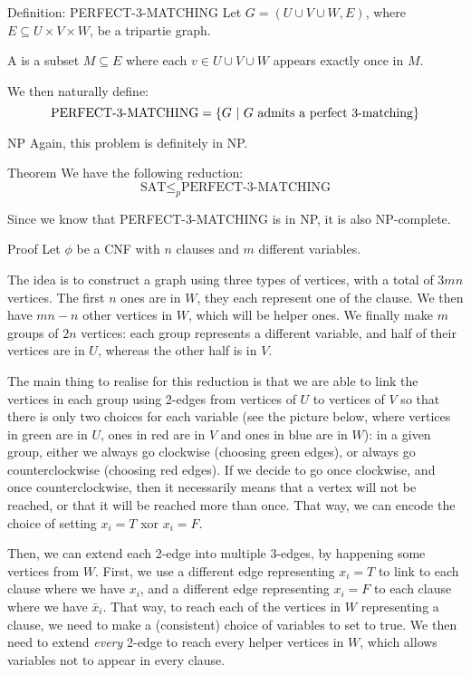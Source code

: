 \documentclass[a4paper]{article}
\begin{document}
\begin{parag}{Definition: PERFECT-3-MATCHING}
    Let $G = \left(U \cup V \cup W, E\right)$, where $E \subseteq U \times V \times W$, be a tripartie graph. 

    A  is a subset $M \subseteq E$ where each $v \in U \cup V \cup W$ appears exactly once in $M$.

    We then naturally define: 
    \[\text{PERFECT-3-MATCHING} = \left\{G \suchthat \text{$G$ admits a perfect 3-matching}\right\}\]
    
    \begin{subparag}{NP}
        Again, this problem is definitely in NP.
    \end{subparag}
\end{parag}

\begin{parag}{Theorem}
    We have the following reduction:
    \[\text{SAT} \leq_p \text{PERFECT-3-MATCHING}\]

    Since we know that PERFECT-3-MATCHING is in NP, it is also NP-complete.

    \begin{subparag}{Proof}
        Let $\phi$ be a CNF with $n$ clauses and $m$ different variables.

        The idea is to construct a graph using three types of vertices, with a total of $3mn$ vertices. The first $n$ ones are in $W$, they each represent one of the clause. We then have $mn - n$ other vertices in $W$, which will be helper ones. We finally make $m$ groups of $2n$ vertices: each group represents a different variable, and half of their vertices are in $U$, whereas the other half is in $V$.

        The main thing to realise for this reduction is that we are able to link the vertices in each group using 2-edges from vertices of $U$ to vertices of $V$ so that there is only two choices for each variable (see the picture below, where vertices in green are in $U$, ones in red are in $V$ and ones in blue are in $W$): in a given group, either we always go clockwise (choosing green edges), or always go counterclockwise (choosing red edges). If we decide to go once clockwise, and once counterclockwise, then it necessarily means that a vertex will not be reached, or that it will be reached more than once. That way, we can encode the choice of setting $x_i = T$ xor $x_i = F$.

        Then, we can extend each 2-edge into multiple 3-edges, by happening some vertices from $W$. First, we use a different edge representing $x_i = T$ to link to each clause where we have $x_i$, and a different edge representing $x_i = F$ to each clause where we have $\bar{x}_i$. That way, to reach each of the vertices in $W$ representing a clause, we need to make a (consistent) choice of variables to set to true. We then need to extend \textit{every} 2-edge to reach every helper vertices in $W$, which allows variables not to appear in every clause.


\end{subparag}
\end{parag}
\end{document}
